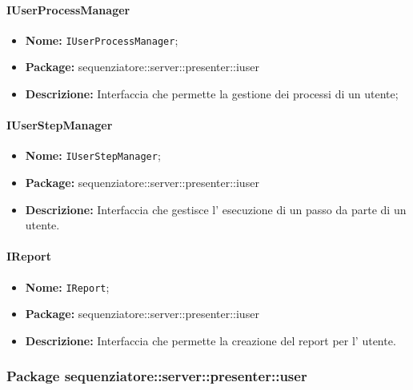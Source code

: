 \paragraph{IUserProcessManager}
	\begin{itemize}
		\item \textbf{Nome:} \texttt{IUserProcessManager};
		\item \textbf{Package:} sequenziatore::server::presenter::iuser
		\item \textbf{Descrizione:} Interfaccia che permette la gestione dei processi di un utente;
	\end{itemize}
\paragraph{IUserStepManager}
	\begin{itemize}
		\item \textbf{Nome:} \texttt{IUserStepManager};
		\item \textbf{Package:} sequenziatore::server::presenter::iuser
		\item \textbf{Descrizione:} Interfaccia che gestisce l' esecuzione di un passo da parte di un utente.
	\end{itemize}
\paragraph{IReport}
	\begin{itemize}
		\item \textbf{Nome:} \texttt{IReport};
		\item \textbf{Package:} sequenziatore::server::presenter::iuser
		\item \textbf{Descrizione:} Interfaccia che permette la creazione del report per l' utente.
	\end{itemize}
	
\subsubsection{Package sequenziatore::server::presenter::user}
